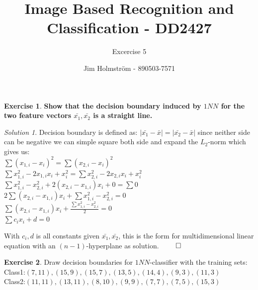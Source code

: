 \documentclass[a4paper,twoside=false,abstract=false,numbers=noenddot,
titlepage=false,headings=small,parskip=half,version=last]{scrartcl}
\author{Jim Holmström - 890503-7571}
\title{Image Based Recognition and Classification - DD2427}
\subtitle{Excercise 5}
\theoremstyle{definition}
\newtheorem{exercise}{Exercise}
\theoremstyle{remark}
\newtheorem*{solution}{Solution}
\begin{document}
\maketitle
\thispagestyle{empty}

\begin{exercise}
{\bf
    Show that the decision boundary induced by $1NN$ for the two feature vectors
    $\bar{x_1},\bar{x_2}$ is a straight line.
}
\end{exercise}
\begin{solution}
    Decision boundary is defined as: $|\bar{x_1}-\bar{x}|=|\bar{x_2}-\bar{x}|$
    since neither side can be negative we can simple square both side and expand
    the $L_2$-norm which gives us:\\

    $\sum{(x_{1,i}-x_i)^2}=\sum{(x_{2,i}-x_i)^2}$\\
    $\sum{x_{1,i}^2-2x_{1,i}x_i+x_i^2}=\sum{x_{2,i}^2-2x_{2,i}x_i+x_i^2}$\\
    $\sum{x_{1,i}^2-x_{2,i}^2+2(x_{2,i}-x_{1,i})x_i+0}=\sum{0}$\\
    $2\sum{(x_{2,i}-x_{1,i})x_i}+\sum{x_{1,i}^2-x_{2,i}^2}=0$\\
    $\sum{(x_{2,i}-x_{1,i})x_i}+\frac{\sum{x_{1,i}^2-x_{2,i}^2}}{2}=0$\\
    $\sum{c_ix_i}+d=0$

    With $c_i,d$ is all constants given $\bar{x_1},\bar{x_2}$, this is the form
    for multidimensional linear equation with an $(n-1)$-hyperplane as
    solution. $\qed$
\end{solution}
\begin{exercise}
Draw decision boundaries for $1NN$-classifier with the training sets:\\
Class1:${(7, 11), (15, 9), (15, 7), (13, 5), (14, 4), (9, 3), (11, 3)}$\\
Class2:${(11, 11), (13, 11), (8, 10), (9, 9), (7, 7), (7, 5), (15, 3)}$\\
\end{exercise}
\end{document}
